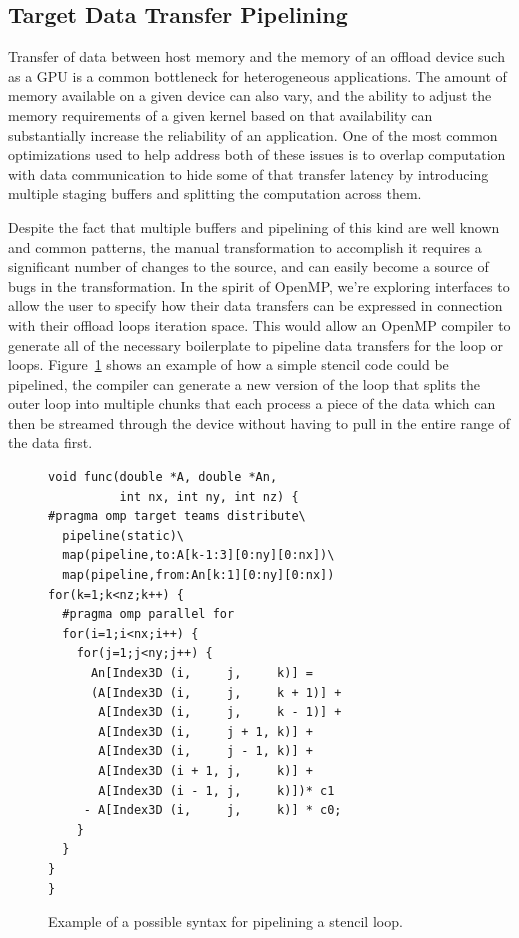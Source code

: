 \subsection{Target Data Transfer Pipelining}
\label{sub:pipelining}

Transfer of data between host memory and the memory of an offload device such as
a GPU is a common bottleneck for heterogeneous applications.  The amount of
memory available on a given device can also vary, and the ability to adjust the
memory requirements of a given kernel based on that availability can
substantially increase the reliability of an application.  One of the most
common optimizations used to help address both of these issues is to overlap
computation with data communication to hide some of that transfer latency by
introducing multiple staging buffers and splitting the computation across them.  

Despite the fact that multiple buffers and pipelining of this kind are well
known and common patterns, the manual transformation to accomplish it requires a
significant number of changes to the source, and can easily become a source of
bugs in the transformation.  In the spirit of OpenMP, we're exploring interfaces
to allow the user to specify how their data transfers can be expressed in
connection with their offload loops iteration space.  This would allow an OpenMP
compiler to generate all of the necessary boilerplate to pipeline data transfers
for the loop or loops.  Figure~\ref{fig:pipeline} shows an example of how a
simple stencil code could be pipelined, the compiler can generate a new version
of the loop that splits the outer loop into multiple chunks that each process a
piece of the data which can then be streamed through the device without having
to pull in the entire range of the data first.

\begin{figure}
\begin{verbatim}
void func(double *A, double *An,
          int nx, int ny, int nz) {
#pragma omp target teams distribute\
  pipeline(static)\
  map(pipeline,to:A[k-1:3][0:ny][0:nx])\
  map(pipeline,from:An[k:1][0:ny][0:nx])
for(k=1;k<nz;k++) {
  #pragma omp parallel for
  for(i=1;i<nx;i++) {
    for(j=1;j<ny;j++) {
      An[Index3D (i,     j,     k)] =
      (A[Index3D (i,     j,     k + 1)] +
       A[Index3D (i,     j,     k - 1)] +
       A[Index3D (i,     j + 1, k)] +
       A[Index3D (i,     j - 1, k)] +
       A[Index3D (i + 1, j,     k)] +
       A[Index3D (i - 1, j,     k)])* c1
     - A[Index3D (i,     j,     k)] * c0;
    }
  } 
}
}
\end{verbatim}
\caption{Example of a possible syntax for pipelining a stencil
loop.\label{fig:pipeline}}
\end{figure}

